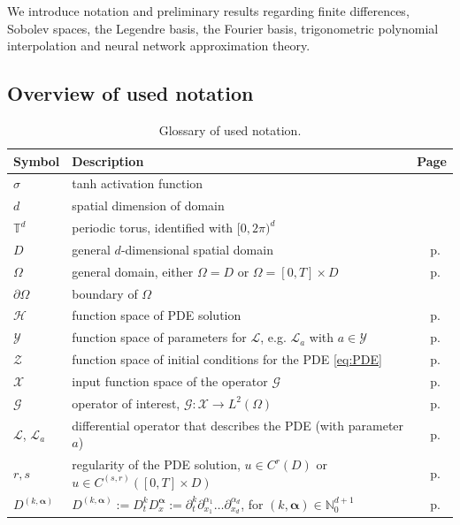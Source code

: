 \documentclass{article}
\numberwithin{equation}{section}
\newcommand{\T}{\mathbb{T}}
\newcommand{\N}{\mathbb{N}}
\newcommand{\cG}{\mathcal{G}}
\newcommand{\cL}{\mathcal{L}}
\newcommand{\cX}{\mathcal{X}}
\newcommand{\cY}{\mathcal{Y}}
\newcommand{\cZ}{\mathcal{Z}}
\newcommand{\bmalpha}{{\bm{\alpha}}}
\newcommand{\1}{\mathbbm{1}}
\begin{document}
We introduce notation and preliminary results regarding finite differences, Sobolev spaces, the Legendre basis, the Fourier basis, trigonometric polynomial interpolation and neural network approximation theory.  

\subsection{Overview of used notation}\label{app:glossary}

\begin{table}[h!]
  \caption{Glossary of used notation.}
  \label{tab:glossary}
  \centering
\begin{tabular}{l p{}  r}
\toprule
\textbf{Symbol} & \textbf{Description} & \textbf{Page}
\\
\midrule
$\sigma$ & tanh activation function & \\
$d$ & spatial dimension of domain &  \\
$\T^d$ & periodic torus, identified with $[0,2\pi)^d$ & \\
$D$ & general $d$-dimensional spatial domain & p.~\pageref{sec:setting} \\
$\Omega$ & general domain, either $\Omega=D$ or $\Omega=[0,T]\times D$ & p.~\pageref{sec:setting} \\
$\partial \Omega$ & boundary of $\Omega$ & \\
{\color{black} $\mathcal{H}$} & function space of PDE solution & p.~\pageref{sec:setting} \\
$\cY$ &  function space of parameters for $\cL$, e.g. $\cL_a$ with $a\in\cY$ & p.~\pageref{sec:setting} \\
$\cZ$ &  function space of initial conditions for the PDE \eqref{eq:PDE} & p.~\pageref{sec:setting} \\
$\cX$ &  input function space of the operator $\cG$ & p.~\pageref{sec:setting} \\
$\cG$ &  operator of interest, $\cG:\cX\to L^2(\Omega)$ & p.~\pageref{sec:setting} \\
$\cL$, $\cL_a$ &  differential operator that describes the PDE (with parameter $a$) & p.~\pageref{sec:setting} \\
$r,s$ &  regularity of the PDE solution, $u\in C^r(D)$ or $u\in C^{(s,r)}([0,T]\times D)$ & p.~\pageref{sec:general} \\
$D^{(k,\bmalpha)}$& $D^{(k,\bmalpha)} := D^k_tD^\bmalpha_x := \partial_t^k \partial^{\alpha_1}_{x_1}\ldots \partial^{\alpha_d}_{x_d}$, for $(k,\bmalpha)\in\N_0^{d+1}$ & p.~\pageref{ass:diff-operator} \\

\end{tabular}
\end{table}
\end{document}
